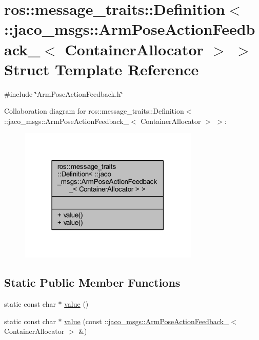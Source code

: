 \hypertarget{structros_1_1message__traits_1_1Definition_3_01_1_1jaco__msgs_1_1ArmPoseActionFeedback___3_01ContainerAllocator_01_4_01_4}{}\section{ros\+:\+:message\+\_\+traits\+:\+:Definition$<$ \+:\+:jaco\+\_\+msgs\+:\+:Arm\+Pose\+Action\+Feedback\+\_\+$<$ Container\+Allocator $>$ $>$ Struct Template Reference}
\label{structros_1_1message__traits_1_1Definition_3_01_1_1jaco__msgs_1_1ArmPoseActionFeedback___3_01ContainerAllocator_01_4_01_4}


{\ttfamily \#include \char`\"{}Arm\+Pose\+Action\+Feedback.\+h\char`\"{}}



Collaboration diagram for ros\+:\+:message\+\_\+traits\+:\+:Definition$<$ \+:\+:jaco\+\_\+msgs\+:\+:Arm\+Pose\+Action\+Feedback\+\_\+$<$ Container\+Allocator $>$ $>$\+:
\nopagebreak
\begin{figure}[H]
\begin{center}
\leavevmode
\includegraphics[width=243pt]{d8/d75/structros_1_1message__traits_1_1Definition_3_01_1_1jaco__msgs_1_1ArmPoseActionFeedback___3_01Con5d4fdd68d3ffae5f7e6cd4f658d4e87a}
\end{center}
\end{figure}
\subsection*{Static Public Member Functions}
\begin{DoxyCompactItemize}
\item 
static const char $\ast$ \hyperlink{structros_1_1message__traits_1_1Definition_3_01_1_1jaco__msgs_1_1ArmPoseActionFeedback___3_01ContainerAllocator_01_4_01_4_a73f56b75c9bf91ad7e2fb268ee927c18}{value} ()
\item 
static const char $\ast$ \hyperlink{structros_1_1message__traits_1_1Definition_3_01_1_1jaco__msgs_1_1ArmPoseActionFeedback___3_01ContainerAllocator_01_4_01_4_aca9fc68e22b2f6f9984575b70b96f247}{value} (const \+::\hyperlink{structjaco__msgs_1_1ArmPoseActionFeedback__}{jaco\+\_\+msgs\+::\+Arm\+Pose\+Action\+Feedback\+\_\+}$<$ Container\+Allocator $>$ \&)
\end{DoxyCompactItemize}



